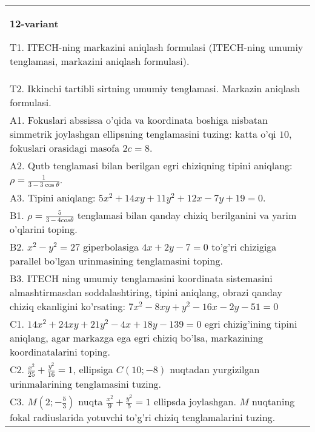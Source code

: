 \documentclass{article}
\begin{document}
\begin{tabular}{m{17cm}}
\textbf{12-variant}
\newline

T1. ITECH-ning markazini aniqlash formulasi (ITECH-ning umumiy tenglamasi, markazini aniqlash formulasi).\\

T2. Ikkinchi tartibli sirtning umumiy tenglamasi. Markazin aniqlash formulasi.\\

A1. Fokuslari abssissa o'qida va koordinata boshiga nisbatan simmetrik joylashgan ellipsning tenglamasini tuzing: katta o'qi $10$, fokuslari orasidagi masofa $2c=8$.\\

A2. Qutb tenglamasi bilan berilgan egri chiziqning tipini aniqlang: $\rho=\frac{1}{3-3\cos\theta}$.\\

A3. Tipini aniqlang: $5x^{2}+14xy+11y^{2}+12x-7y+19=0$.\\

B1. $\rho = \frac{5}{3 - 4cos\theta}$ tenglamasi bilan qanday chiziq berilganini va yarim o'qlarini toping.  \\

B2. $x^{2} - y^{2} = 27$ giperbolasiga $4x + 2y - 7 = 0$ to'g'ri chizigiga parallel bo'lgan urinmasining tenglamasini toping.  \\

B3. ITECH ning umumiy tenglamasini koordinata sistemasini almashtirmasdan soddalashtiring, tipini aniqlang, obrazi qanday chiziq ekanligini ko'rsating: $7x^{2} - 8xy + y^{2} - 16x - 2y - 51 = 0$\\

C1. $14x^{2} + 24xy + 21y^{2} - 4x + 18y - 139 = 0$ egri chizig'ining tipini aniqlang, agar markazga ega egri chiziq bo'lsa, markazining koordinatalarini toping.  \\

C2. $\frac{x^{2}}{25} + \frac{y^{2}}{16} = 1$, ellipsiga $C(10; - 8)$ nuqtadan yurgizilgan urinmalarining tenglamasini tuzing.  \\

C3. $M(2; - \frac{5}{3})$ nuqta $\frac{x^{2}}{9} + \frac{y^{2}}{5} = 1$ ellipsda joylashgan. $M$ nuqtaning fokal radiuslarida yotuvchi to'g'ri chiziq tenglamalarini tuzing.  \\

\end{tabular}
\vspace{1cm}
\end{document}
